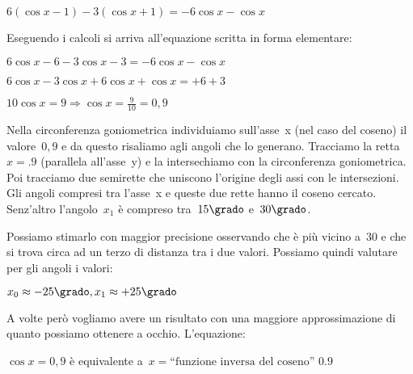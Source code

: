 \begin{esempio}
  $6 ( \cos x -1) -3 ( \cos x +1) = -6 \cos x - \cos x$
  
  Eseguendo i calcoli si arriva all'equazione scritta in forma elementare:
  
  $6 \cos x -6 -3 \cos x -3 = -6 \cos x - \cos x$
  
  $6 \cos x -3 \cos x +6 \cos x + \cos x = +6 +3$
  
  $10 \cos x= 9 \Rightarrow \cos x = \frac{9}{10} = 0,9$


 \vspace{-6pt}
 \begin{minipage}{.50\textwidth}
Nella circonferenza goniometrica individuiamo sull'asse~x (nel caso del 
coseno) il valore~$0,9$ e da questo risaliamo agli angoli che lo generano.
Tracciamo la retta~$x=.9$ (parallela all'asse~y) e la intersechiamo con
la circonferenza goniometrica. Poi tracciamo due semirette che uniscono 
l'origine degli assi con le intersezioni. Gli angoli compresi tra l'asse~x 
e queste due rette hanno il coseno cercato. Senz'altro l'angolo~$x_1$ è 
compreso tra~$15\grado$ e~$30\grado$.

Possiamo stimarlo con maggior precisione osservando che è più vicino a~$30$ 
e che si trova circa ad un terzo di distanza tra i due valori. 
Possiamo quindi valutare per gli angoli i valori:

$x_0 \approx -25\grado, x_1 \approx +25\grado$
 \end{minipage}
 \begin{minipage}{.45\textwidth}
  \begin{center}
\begin{inaccessibleblock}[Soluzione grafica approssimata dell'equazione: 
    $\cos x = 0,8$.]
    
\end{inaccessibleblock}
  \end{center}
 \end{minipage}
 
 \end{esempio}

A volte però vogliamo avere un risultato con una maggiore approssimazione di 
quanto possiamo ottenere a occhio. L'equazione:

$\cos x = 0,9$ è equivalente 
a~$x = \text{``funzione inversa del coseno'' } 0.9$

